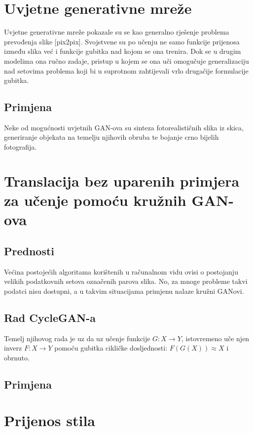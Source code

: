 \documentclass[lmodern, utf8, seminar]{fer}
\begin{document}
\chapter{Uvjetne generativne mreže}
Uvjetne generativne mreže pokazale su se kao generalno rješenje problema prevođenja slike [pix2pix]. Svojstvene su po učenju ne samo funkcije prijenosa između slika već i funkcije gubitka nad kojom se ona trenira.
Dok se u drugim modelima ona ručno zadaje, pristup u kojem se ona uči omogučuje generalizaciju nad setovima problema koji bi u suprotnom zahtijevali vrlo drugačije formulacije gubitka.
\newline

\section{Primjena}
Neke od mogućnosti uvjetnih GAN-ova su sinteza fotorealističnih slika iz skica, generiranje objekata na temelju njihovih obruba te bojanje crno bijelih fotografija.



\chapter{Translacija bez uparenih primjera za učenje pomoću kružnih GAN-ova}
\section{Prednosti}
Većina postojećih algoritama korištenih u računalnom vidu ovisi o postojanju velikih podatkovnih setova označenih parova slika. No, za mnoge probleme takvi podatci nisu dostupni, a u takvim situacijama primjenu nalaze kružni GANovi.
\newline

\section{Rad CycleGAN-a}
Temelj njihovog rada je uz da uz učenje funkcije $G: X \rightarrow Y$, istovremeno uče njen inverz $F: X \rightarrow Y$ pomoću gubitka cikličke dosljednosti: $F(G(X)) \approx X$ i obrnuto.
\section{Primjena}


\chapter{Prijenos stila}
\end{document}
